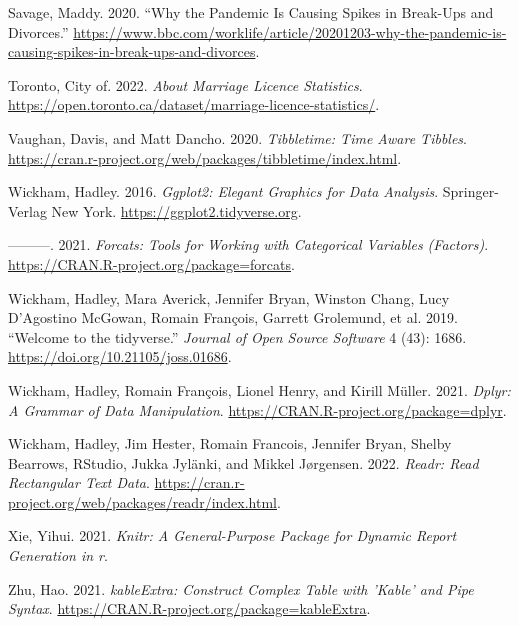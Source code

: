\documentclass[
]{article}
\newlength{\cslhangindent}
\newlength{\cslentryspacingunit} %
\newenvironment{CSLReferences}[2] %
 {%
  \setlength{\parindent}{0pt}
  \ifodd #1
  \let\oldpar\par
  \def\par{\hangindent=\cslhangindent\oldpar}
  \fi
  \setlength{\parskip}{#2\cslentryspacingunit}
 }%
 {}
\begin{document}
\begin{CSLReferences}{1}{0}
\leavevmode{}%
Savage, Maddy. 2020. {``Why the Pandemic Is Causing Spikes in Break-Ups and Divorces.''} \url{https://www.bbc.com/worklife/article/20201203-why-the-pandemic-is-causing-spikes-in-break-ups-and-divorces}.

\leavevmode{}%
Toronto, City of. 2022. \emph{About Marriage Licence Statistics}. \url{https://open.toronto.ca/dataset/marriage-licence-statistics/}.

\leavevmode{}%
Vaughan, Davis, and Matt Dancho. 2020. \emph{Tibbletime: Time Aware Tibbles}. \url{https://cran.r-project.org/web/packages/tibbletime/index.html}.

\leavevmode{}%
Wickham, Hadley. 2016. \emph{Ggplot2: Elegant Graphics for Data Analysis}. Springer-Verlag New York. \url{https://ggplot2.tidyverse.org}.

\leavevmode{}%
---------. 2021. \emph{Forcats: Tools for Working with Categorical Variables (Factors)}. \url{https://CRAN.R-project.org/package=forcats}.

\leavevmode{}%
Wickham, Hadley, Mara Averick, Jennifer Bryan, Winston Chang, Lucy D'Agostino McGowan, Romain François, Garrett Grolemund, et al. 2019. {``Welcome to the {tidyverse}.''} \emph{Journal of Open Source Software} 4 (43): 1686. \url{https://doi.org/10.21105/joss.01686}.

\leavevmode{}%
Wickham, Hadley, Romain François, Lionel Henry, and Kirill Müller. 2021. \emph{Dplyr: A Grammar of Data Manipulation}. \url{https://CRAN.R-project.org/package=dplyr}.

\leavevmode{}%
Wickham, Hadley, Jim Hester, Romain Francois, Jennifer Bryan, Shelby Bearrows, RStudio, Jukka Jylänki, and Mikkel Jørgensen. 2022. \emph{Readr: Read Rectangular Text Data}. \url{https://cran.r-project.org/web/packages/readr/index.html}.

\leavevmode{}%
Xie, Yihui. 2021. \emph{Knitr: A General-Purpose Package for Dynamic Report Generation in r}.

\leavevmode{}%
Zhu, Hao. 2021. \emph{kableExtra: Construct Complex Table with 'Kable' and Pipe Syntax}. \url{https://CRAN.R-project.org/package=kableExtra}.

\end{CSLReferences}
\end{document}
